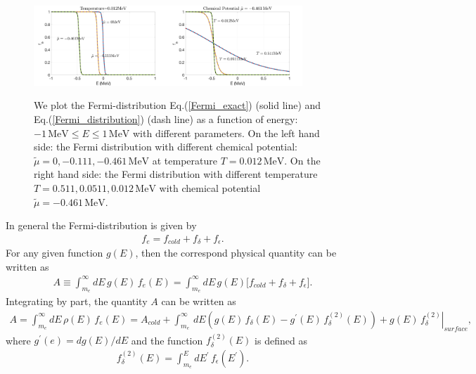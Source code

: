 \documentclass[onecolumn,preprintnumbers,amsmath,amssymb]{revtex4}
\begin{document}
\begin{figure}[h]
\begin{center}
\includegraphics[width=0.45\textwidth]{./plot/Fermi_Chemical_negative}\includegraphics[width=0.45\textwidth]{./plot/Fermi_Temperature_negative}
\caption{We plot the Fermi-distribution Eq.(\ref{Fermi_exact}) (solid line) and Eq.(\ref{Fermi_distribution}) (dash line) as a function of energy:$-1\,\mathrm{MeV}\leqslant E\leqslant1\,\mathrm{MeV}$ with different parameters. On the left hand side: the Fermi distribution with different chemical potential: $\tilde\mu=0, -0.111, -0.461\, \mathrm{MeV}$ at temperature $T=0.012\,\mathrm{MeV}$. On the right hand side: the Fermi distribution with different temperature $T=0.511, 0.0511, 0.012\,\mathrm{MeV}$ with chemical potential $\tilde\mu=-0.461\,\mathrm{MeV}$.}
\label{Fermi_Checking2}
\end{center}
\end{figure}


In general the Fermi-distribution is given by
\begin{align}
f_e=f_{cold} +f_\delta+f_\epsilon.
\end{align}
For any given function $g(E)$, then the correspond physical quantity can be written as
\begin{align}
A\equiv\int^{\infty}_{m_e}dE\,g(E)\,f_e(E)=\int^{\infty}_{m_e}dE\,g(E)\bigg[f_{cold} +f_\delta+f_\epsilon\bigg].
\end{align}
Integrating by part, the quantity $A$ can be written as
\begin{align}
\label{N_electron}
A=\int^{\infty}_{m_e}dE\,\rho(E)\,f_e(E)=A_{cold}+\int^{\infty}_{m_e}\,dE\left(g(E)\,f_\delta(E)-g^\prime(E)\,f^{(2)}_\delta(E)\right)+\left.g(E)\,f^{(2)}_\delta\right|_{surface},
\end{align}
where $g^\prime(e)=dg(E)/dE$ and the function $f^{(2)}_\delta(E)$ is defined as
\begin{align}
f^{(2)}_\delta(E)=\int^E_{m_e}dE^\prime\,f_\epsilon(E^\prime).
\end{align}
\end{document}
